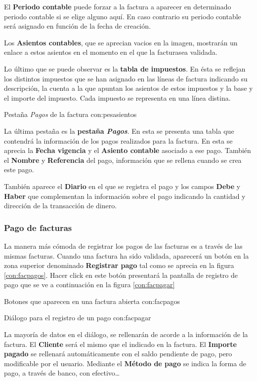 El \textbf{Periodo contable} puede forzar a la factura a aparecer en determinado periodo contable si se elige alguno aquí. En caso contrario su periodo contable será asignado en función de la fecha de creación.

Los \textbf{Asientos contables}, que se aprecian vacios en la imagen, mostrarán un enlace a estos asientos en el momento en el que la facturasea validada.

Lo último que se puede observar es la \textbf{tabla de impuestos}. En ésta se reflejan los distintos impuestos que se han asignado en las líneas de factura indicando su descripción, la cuenta a la que apuntan los asientos de estos impuestos y la base y el importe del impuesto. Cada impuesto se representa en una línea distina.

{Pestaña \emph{Pagos} de la factura}
{con:pesasientos}

La última pestaña es la \textbf{pestaña \emph{Pagos}}. En esta se presenta una tabla que contendrá la información de los pagos realizados para la factura. En esta se aprecia la \textbf{Fecha vigencia} y el \textbf{Asiento contable} asociado a ese pago. También el \textbf{Nombre} y \textbf{Referencia} del pago, información que se rellena cuando se crea este pago.

También aparece el \textbf{Diario} en el que se registra el pago y los campos \textbf{Debe} y \textbf{Haber} que complementan la información sobre el pago indicando la cantidad y dirección de la transacción de dinero.

\subsubsection{Pago de facturas}

La manera más cómoda de registrar los pagos de las facturas es a través de las mismas facturas. Cuando una factura ha sido validada, aparecerá un botón en la zona superior denominado \textbf{Registrar pago} tal como se aprecia en la figura \ref{con:facpagos}. Hacer click en este botón presentará la pantalla de registro de pago que se ve a continuación en la figura \ref{con:facpagar}

{Botones que aparecen en una factura abierta}
{con:facpagos}

{Diálogo para el registro de un pago}
{con:facpagar}

La mayoría de datos en el diálogo, se rellenarán de acorde a la información de la factura. El \textbf{Cliente} será el mismo que el indicado en la factura. El \textbf{Importe pagado} se rellenará automáticamente con el saldo pendiente de pago, pero modificable por el usuario. Mediante el \textbf{Método de pago} se indica la forma de pago, a través de banco, con efectivo\ldots


